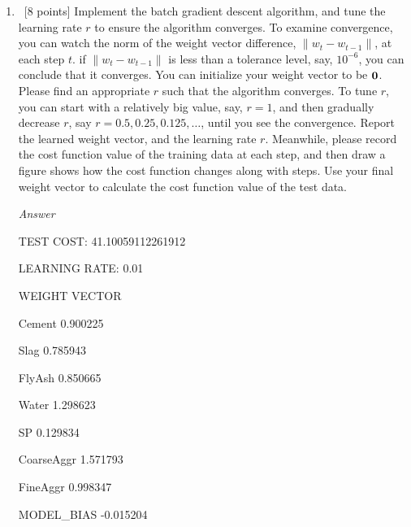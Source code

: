\documentclass[12pt, fullpage,letterpaper]{article}
\begin{document}
\begin{enumerate}
	\begin{enumerate}
		\item~[8 points] Implement the batch gradient descent algorithm, and tune the learning rate $r$ to ensure the algorithm converges.  To examine convergence, you can watch the norm of the weight vector difference,  $\|w_{t} - w_{t-1}\|$,  at each step $t$.  if $\|w_{t} - w_{t-1}\|$ is  less than a tolerance level, say, $10^{-6}$, you can conclude that it converges. You can initialize your weight vector to be ${\bf 0}$.  Please find an appropriate $r$ such that the algorithm converges. To tune $r$, you can start with a relatively big value, say, $r=1$, and then gradually decrease $r$, say $r=0.5, 0.25, 0.125, \ldots$, until you see the convergence. 
		Report the learned weight vector, and the learning rate $r$. Meanwhile, please record the cost function  value of the training data at each step, and then draw a figure shows how the cost function changes along with steps. Use your final weight vector to calculate  the cost function value of the test data. 
		
		\emph{Answer}
		
		TEST COST: 41.10059112261912
    
        LEARNING RATE: 0.01
    
        WEIGHT VECTOR
        
        Cement        0.900225
        
        Slag          0.785943
        
        FlyAsh        0.850665
        
        Water         1.298623
        
        SP            0.129834
        
        CoarseAggr    1.571793
        
        FineAggr      0.998347
        
        MODEL\_BIAS   -0.015204
        

\end{enumerate}
\end{enumerate}
\end{document}
